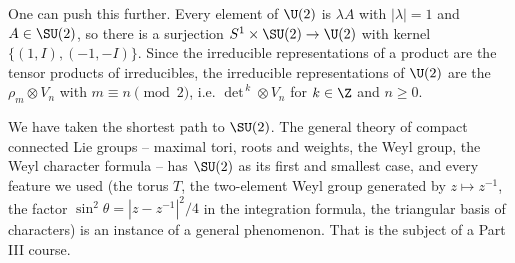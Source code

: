 \begin{example}
	One can push this further. Every element of $\U(2)$ is $\lambda A$ with $|\lambda| = 1$ and $A\in\SU(2)$, so there is a surjection $S^1\times\SU(2)\to\U(2)$ with kernel $\{(1,I),(-1,-I)\}$. Since the irreducible representations of a product are the tensor products of irreducibles, the irreducible representations of $\U(2)$ are the $\rho_m\otimes V_n$ with $m\equiv n\pmod 2$, i.e. $\det^{\,k}\otimes V_n$ for $k \in\Z$ and $n\geq0$.
\end{example}

\begin{remark}
	We have taken the shortest path to $\SU(2)$. The general theory of compact connected Lie groups -- maximal tori, roots and weights, the Weyl group, the Weyl character formula -- has $\SU(2)$ as its first and smallest case, and every feature we used (the torus $T$, the two-element Weyl group generated by $z\mapsto z^{-1}$, the factor $\sin^2\theta = |z - z^{-1}|^2/4$ in the integration formula, the triangular basis of characters) is an instance of a general phenomenon. That is the subject of a Part III course.
\end{remark}

